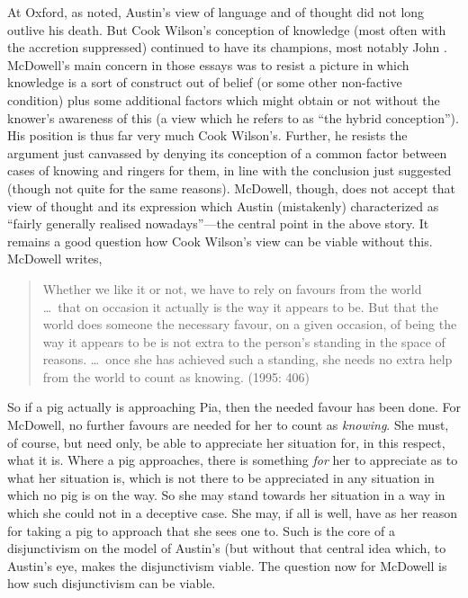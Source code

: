At Oxford, as noted, Austin's view of language and of thought did not long outlive his death. But Cook Wilson's conception of knowledge (most often with the accretion suppressed) continued to have its champions, most notably John \citet[]{McDowell:1982kx,McDowell:1994am}. McDowell’s main concern in those essays was to resist a picture in which knowledge is a sort of construct out of belief (or some other non-factive condition) plus some additional factors which might obtain or not without the knower's awareness of this (a view which he refers to as ``the hybrid conception''). His position is thus far very much Cook Wilson's. Further, he resists the argument just canvassed by denying its conception of a common factor between cases of knowing and ringers for them, in line with the conclusion just suggested (though not quite for the same reasons). McDowell, though, does not accept that view of thought and its expression which Austin (mistakenly) characterized as ``fairly generally realised nowadays''---the central point in the above story. It remains a good question how Cook Wilson’s view can be viable without this. McDowell writes,
\begin{quote}
	Whether we like it or not, we have to rely on favours from the world \ldots\ that on occasion it actually is the way it appears to be. But that the world does someone the necessary favour, on a given occasion, of being the way it appears to be is not extra to the person’s standing in the space of reasons. \ldots\ once she has achieved such a standing, she needs no extra help from the world to count as knowing. (1995: 406)
\end{quote}
So if a pig actually is approaching Pia, then the needed favour has been done. For McDowell, no further favours are needed for her to count as \emph{knowing}. She must, of course, but need only, be able to appreciate her situation for, in this respect, what it is. Where a pig approaches, there is something \emph{for} her to appreciate as to what her situation is, which is not there to be appreciated in any situation in which no pig is on the way. So she may stand towards her situation in a way in which she could not in a deceptive case. She may, if all is well, have as her reason for taking a pig to approach that she sees one to. Such is the core of a disjunctivism on the model of Austin's (but without that central idea which, to Austin’s eye, makes the disjunctivism viable. The question now for McDowell is how such disjunctivism can be viable.

